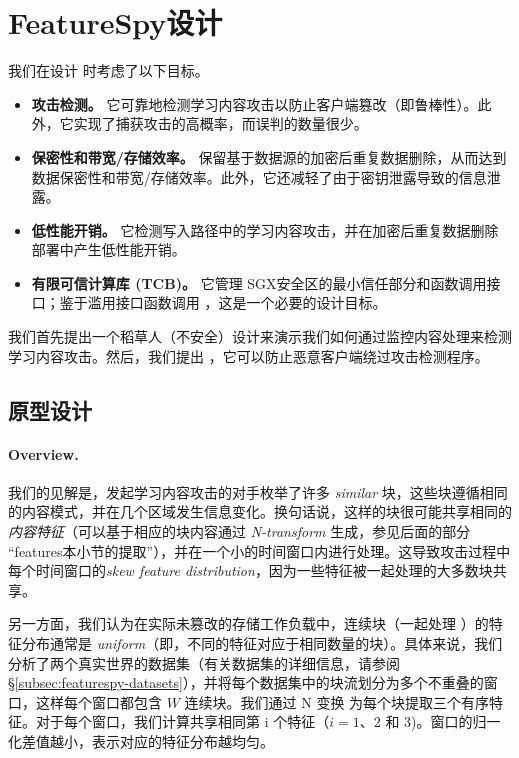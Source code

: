 \section{FeatureSpy设计}
\label{sec:featurespy-design}
我们在设计 \sysnameF 时考虑了以下目标。

\begin{itemize}[leftmargin=*]
\item {\bf 攻击检测。} 它可靠地检测学习内容攻击以防止客户端篡改（即鲁棒性）。此外，它实现了捕获攻击的高概率，而误判的数量很少。
\item {\bf 保密性和带宽/存储效率。} 保留基于数据源的加密后重复数据删除，从而达到数据保密性和带宽/存储效率。此外，它还减轻了由于密钥泄露导致的信息泄露。
\item {\bf 低性能开销。} 它检测写入路径中的学习内容攻击，并在加密后重复数据删除部署中产生低性能开销。
\item {\bf 有限可信计算库 (TCB)。} 它管理 SGX安全区的最小信任部分和函数调用接口；鉴于滥用接口函数调用 \cite{lie05}，这是一个必要的设计目标。
\end{itemize}

我们首先提出一个稻草人（不安全）设计来演示我们如何通过监控内容处理来检测学习内容攻击。然后，我们提出 \sysnameF，它可以防止恶意客户端绕过攻击检测程序。


\subsection{原型设计}
\label{subsec:featurespy-basic}
\paragraph*{Overview.} 我们的见解是，发起学习内容攻击的对手枚举了许多 {\em similar} 块，这些块遵循相同的内容模式，并在几个区域发生信息变化。换句话说，这样的块很可能共享相同的 {\em 内容特征}（可以基于相应的块内容通过 {\em N-transform} \cite{shilane12} 生成，参见后面的部分 “features本小节的提取”），并在一个小的时间窗口内进行处理。这导致攻击过程中每个时间窗口的{\em skew feature distribution}，因为一些特征被一起处理的大多数块共享。

另一方面，我们认为在实际未篡改的存储工作负载中，连续块（一起处理 \cite{zhu2008avoiding}）的特征分布通常是 {\em uniform}（即，不同的特征对应于相同数量的块）。具体来说，我们分析了两个真实世界的数据集（有关数据集的详细信息，请参阅 \S\ref{subsec:featurespy-datasets}），并将每个数据集中的块流划分为多个不重叠的窗口，这样每个窗口都包含 $W$ 连续块。我们通过 N 变换 \cite{shilane12} 为每个块提取三个有序特征。对于每个窗口，我们计算共享相同第 i 个特征（$ i=1、2$ 和 $3$)。窗口的归一化差值越小，表示对应的特征分布越均匀。


